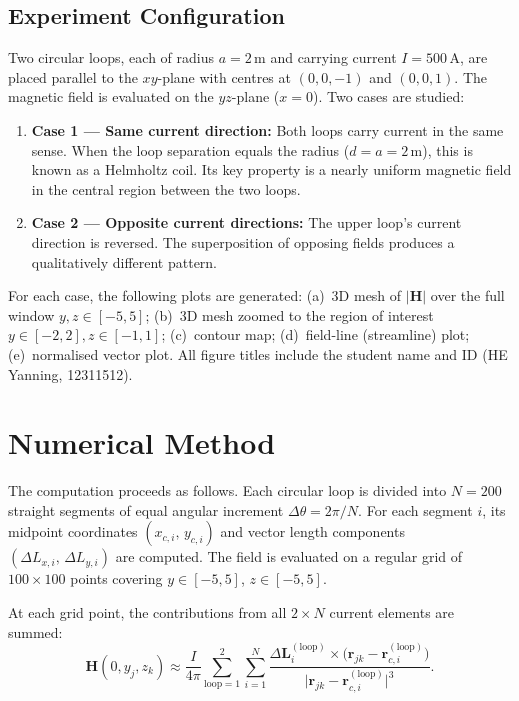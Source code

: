 \documentclass[12pt,a4paper]{article}
\begin{document}
\subsection{Experiment Configuration}

Two circular loops, each of radius $a = 2\,\mathrm{m}$ and carrying current $I = 500\,\mathrm{A}$, are placed parallel to the $xy$-plane with centres at $(0,0,-1)$ and $(0,0,1)$. The magnetic field is evaluated on the $yz$-plane ($x = 0$). Two cases are studied:

\begin{enumerate}[label=(\roman*)]
    \item \textbf{Case 1 --- Same current direction:} Both loops carry current in the same sense. When the loop separation equals the radius ($d = a = 2\,\mathrm{m}$), this is known as a Helmholtz coil. Its key property is a nearly uniform magnetic field in the central region between the two loops.
    \item \textbf{Case 2 --- Opposite current directions:} The upper loop's current direction is reversed. The superposition of opposing fields produces a qualitatively different pattern.
\end{enumerate}

For each case, the following plots are generated: (a)~3D mesh of $|\mathbf{H}|$ over the full window $y,z \in [-5,5]$; (b)~3D mesh zoomed to the region of interest $y \in [-2,2], z \in [-1,1]$; (c)~contour map; (d)~field-line (streamline) plot; (e)~normalised vector plot. All figure titles include the student name and ID (HE Yanning, 12311512).

\section{Numerical Method}

The computation proceeds as follows. Each circular loop is divided into $N = 200$ straight segments of equal angular increment $\Delta\theta = 2\pi/N$. For each segment $i$, its midpoint coordinates $(x_{c,i},\, y_{c,i})$ and vector length components $(\Delta L_{x,i},\, \Delta L_{y,i})$ are computed. The field is evaluated on a regular grid of $100 \times 100$ points covering $y \in [-5,5]$, $z \in [-5,5]$.

At each grid point, the contributions from all $2 \times N$ current elements are summed:
\begin{equation}\label{eq:disc}
    \mathbf{H}(0, y_j, z_k) \approx \frac{I}{4\pi} \sum_{\text{loop}=1}^{2} \sum_{i=1}^{N}
    \frac{\Delta\mathbf{L}_{i}^{(\text{loop})} \times \bigl(\mathbf{r}_{jk} - \mathbf{r}_{c,i}^{(\text{loop})}\bigr)}
         {\bigl|\mathbf{r}_{jk} - \mathbf{r}_{c,i}^{(\text{loop})}\bigr|^{3}}.
\end{equation}
\end{document}
